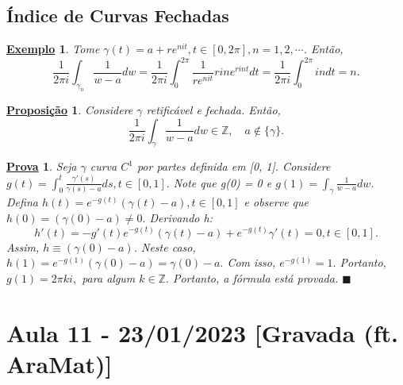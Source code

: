 \documentclass{article}
\newtheorem{example}{\underline{Exemplo}}[section]
\newtheorem*{proof*}{\underline{Prova}}
\newtheorem*{prop*}{\underline{Proposi\c c\~ao}}
\renewcommand\qedsymbol{$\blacksquare$}
\begin{document}
  \subsection{\'Indice de Curvas Fechadas}
  \begin{example}
    Tome $\gamma(t) = a + re^{nit}, t\in[0, 2\pi], n=1, 2, \cdots$. Ent\~ao,
    $$
    \frac{1}{2\pi i}\int_{\gamma_{n}}^{}\frac{1}{w-a}dw = \frac{1}{2\pi  i}\int_{0}^{2\pi}\frac{1}{re^{nit}}rine^{rint}dt = \frac{1}{2\pi i}\int_{0}^{2\pi} indt = n.
    $$
  \end{example}
  \begin{prop*}
    Considere $\gamma$ retific\'avel e fechada. Ent\~ao, 
    $$
    \frac{1}{2\pi i}\int_{\gamma}^{}\frac{1}{w-a}dw\in \mathbb{Z}, \quad a\not\in \{\gamma\}.
    $$
  \end{prop*}
  \begin{proof*}
    Seja $\gamma$ curva $C^{1}$ por partes definida em [0, 1]. Considere $g(t) = \int_{0}^{t}\frac{\gamma'(s)}{\gamma(s) - a}ds, t\in[0, 1].$
    Note que g(0) = 0 e $g(1) = \int_{\gamma}^{}\frac{1}{w-a}dw.$ Defina $h(t) = e^{-g(t)}(\gamma(t) - a), t\in[0, 1]$ e observe que
    $h(0) = (\gamma(0) - a)\neq0.$ Derivando h:
    $$
    h'(t) = -g'(t)e^{-g(t)}(\gamma(t) - a) + e^{-g(t)}\gamma'(t) = 0, t\in[0, 1]. 
    $$
    Assim, $h\equiv{(\gamma(0) - a)}$. Neste caso, $h(1) = e^{-g(1)}(\gamma(0)-a) = \gamma(0) - a.$ Com isso, $e^{-g(1)} = 1.$ Portanto,
    $g(1) = 2\pi ki,$ para algum $k\in \mathbb{Z}.$ Portanto, a f\'ormula est\'a provada. \qedsymbol
  \end{proof*}
  \newpage

  \section{Aula 11 - 23/01/2023 [Gravada (ft. AraMat)]}
\end{document}
